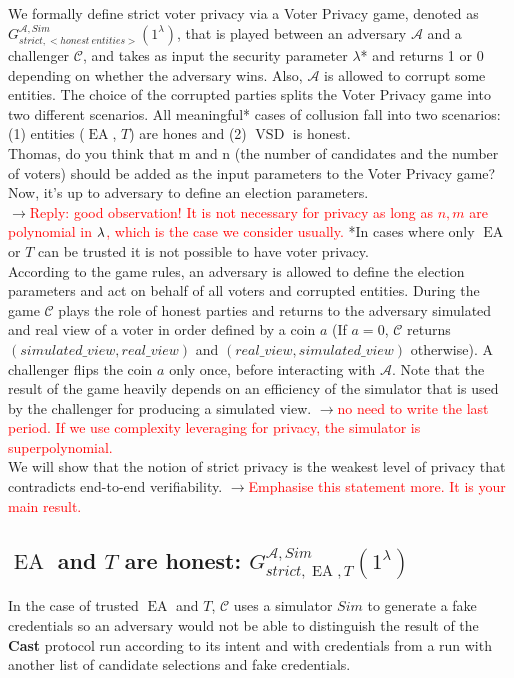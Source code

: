 \documentclass[12pt]{article}
\newcommand{\fix}[2]{\sout{#1}$\rightarrow$\textcolor{red}{#2}}
\DeclareMathOperator{\vsd}{VSD}
\DeclareMathOperator{\ea}{EA}
\begin{document}
We formally define strict voter privacy via a Voter Privacy game, denoted as $G_{strict,<honest~entities>}^{\mathcal{A}, Sim}(1^{\lambda})$, that is played between an adversary $\mathcal{A}$ and a challenger $\mathcal{C}$, and takes as input the security parameter $\lambda${\color{blue}*} and returns 1 or 0 depending on whether the adversary wins.  Also, $\mathcal{A}$ is  allowed to corrupt some entities. The choice of the corrupted parties splits the Voter Privacy game into two different scenarios. All meaningful* cases of collusion fall into two scenarios: (1) entities ($\ea$, $T$) are hones and (2) $\vsd$ is honest. \\
{\color{blue} Thomas, do you think that m and n (the number of candidates and the number of voters)  should be added as the input parameters to the Voter Privacy game? Now, it's up to adversary to define an election parameters. }\\
\fix{}{Reply: good observation! It is not necessary for privacy as long as $n,m$ are polynomial in $\lambda$, which is the case we consider usually.}
*In cases where only $\ea$ or $T$ can be trusted it is not possible to have voter privacy. \\

 According to the game rules, an adversary is allowed to define the election parameters and act on behalf of all voters and corrupted entities. During the game $\mathcal{C}$ plays the role of honest parties and returns to the adversary simulated and real view of a voter in order defined by a coin $a$ (If $a=0$, $\mathcal{C}$ returns $(simulated\_view,real\_view)$ and  $(real\_view,simulated\_view)$ otherwise). A challenger flips the coin $a$ only once, before interacting with $\mathcal{A}$.  Note that the result of the game heavily depends on an efficiency of the simulator that is used by the challenger for producing a simulated view. \fix{}{no need to write the last period. If we use complexity leveraging for privacy, the simulator is superpolynomial.}\\

We will show that the notion of strict privacy is the weakest level of privacy that contradicts end-to-end verifiability. \fix{}{Emphasise this statement more. It is your main result.}

\subsection{$\ea$ and $T$ are honest: $G_{strict,\ea,T}^{\mathcal{A}, Sim}(1^{\lambda})$}
In the case of trusted $\ea$ and $T$,  $\mathcal{C}$ uses a simulator $Sim$ to generate a fake credentials so an adversary would not be able to distinguish the result of the \textbf{Cast} protocol run according to its intent and with credentials from a run with another list of candidate selections and fake credentials. \\
\end{document}
